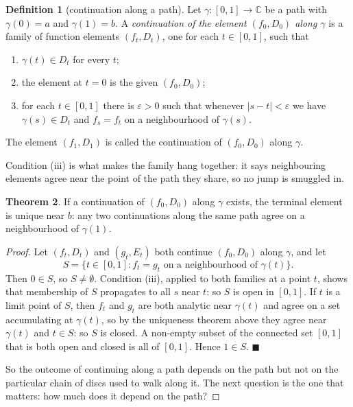 \documentclass[11pt,a4paper]{article}
\theoremstyle{definition}
\newtheorem{thm}{Theorem}[section]
\newtheorem{definition}[thm]{Definition}
\begin{document}
\begin{definition}[continuation along a path]
Let $\gamma : [0,1] \rightarrow \mathbb{C}$ be a path with $\gamma(0) = a$ and
$\gamma(1) = b$. A \emph{continuation of the element $(f_0, D_0)$ along $\gamma$}
is a family of function elements $(f_t, D_t)$, one for each $t \in [0,1]$, such
that
\begin{enumerate}
\item[(i).] $\gamma(t) \in D_t$ for every $t$;
\item[(ii).] the element at $t = 0$ is the given $(f_0, D_0)$;
\item[(iii).] for each $t \in [0,1]$ there is $\varepsilon > 0$ such that
whenever $\left|s - t\right| < \varepsilon$ we have $\gamma(s) \in D_t$ and
$f_s = f_t$ on a neighbourhood of $\gamma(s)$.
\end{enumerate}
The element $(f_1, D_1)$ is called the continuation of $(f_0,D_0)$ along
$\gamma$.

Condition (iii) is what makes the family hang together: it says neighbouring
elements agree near the point of the path they share, so no jump is smuggled in.
\end{definition}

\begin{thm}
If a continuation of $(f_0, D_0)$ along $\gamma$ exists, the terminal element is
unique near $b$: any two continuations along the same path agree on a
neighbourhood of $\gamma(1)$.
\end{thm}

\begin{proof}
Let $(f_t, D_t)$ and $(g_t, E_t)$ both continue $(f_0, D_0)$ along $\gamma$, and
let
$$S = \{ t \in [0,1] : f_t = g_t \text{ on a neighbourhood of } \gamma(t)\}.$$
Then $0 \in S$, so $S \neq \emptyset$. Condition (iii), applied to both families
at a point $t$, shows that membership of $S$ propagates to all $s$ near $t$: so
$S$ is open in $[0,1]$. If $t$ is a limit point of $S$, then $f_t$ and $g_t$ are
both analytic near $\gamma(t)$ and agree on a set accumulating at $\gamma(t)$, so
by the uniqueness theorem above they agree near $\gamma(t)$ and $t \in S$: so $S$
is closed. A non-empty subset of the connected set $[0,1]$ that is both open and
closed is all of $[0,1]$. Hence $1 \in S$. $\blacksquare$

So the outcome of continuing along a path depends on the path but not on the
particular chain of discs used to walk along it. The next question is the one
that matters: how much does it depend on the path?
\end{proof}
\end{document}
